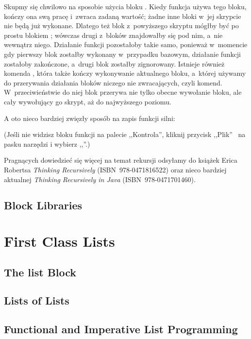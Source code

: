 \documentclass[a4paper]{report}
\begin{document}
Skupmy się chwilowo na sposobie użycia bloku . Kiedy funkcja używa tego bloku, kończy ona swą pracę i~zwraca zadaną wartość; żadne inne bloki w~jej skrypcie nie będą już wykonane. Dlatego też blok  z~powyższego skryptu mógłby być po prostu blokiem ; wówczas drugi z~bloków  znajdowałby się pod nim, a~nie wewnątrz niego. Działanie funkcji pozostałoby takie samo, ponieważ w~momencie gdy pierwszy blok  zostałby wykonany w~przypadku bazowym, działanie funkcji zostałoby zakończone, a~drugi blok  zostałby zignorowany. Istnieje również komenda , która także kończy wykonywanie aktualnego bloku, a~której używamy do przerywania działania bloków niczego nie zwracających, czyli komend. W~przeciwieństwie do niej blok  przerywa nie tylko obecne wywołanie bloku, ale cały wywołujący go skrypt, aż do najwyższego poziomu.

A oto nieco bardziej zwięzły sposób na zapis funkcji silni:\nopagebreak


(Jeśli nie widzisz bloku funkcji  na palecie ,,Kontrola'', kliknij przycisk ,,Plik''~ na pasku narzędzi i wybierz ,,''.)

Pragnących dowiedzieć się więcej na temat rekursji odsyłamy do książek Erica Robertsa \textit{Thinking Recursively} (ISBN~978-0471816522) oraz nieco bardziej aktualnej \textit{Thinking Recursively in Java} (ISBN~978-0471701460).

\section{Block Libraries}
\chapter{First Class Lists}
\section{The list Block}
\section{Lists of Lists}
\section{Functional and Imperative List Programming}
\end{document}
